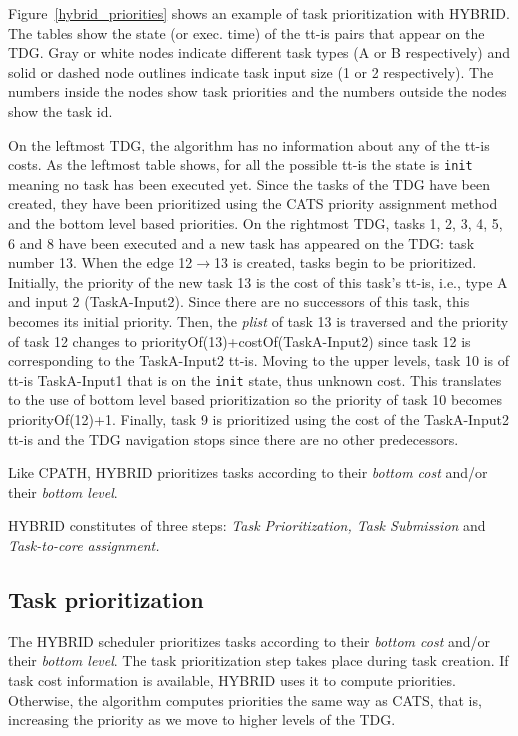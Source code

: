 Figure~\ref{hybrid_priorities} shows an example of task prioritization with HYBRID.
The tables show the state (or exec. time) of the tt-is pairs that appear on the TDG. Gray or white nodes indicate different task types (A or B respectively) and solid or dashed node outlines indicate task input size (1 or 2 respectively). The numbers inside the nodes show task priorities and the numbers outside the nodes show the task id.

On the leftmost TDG, the algorithm has no information about any of the tt-is costs.
As the leftmost table shows, for all the possible tt-is the state is \texttt{init} meaning no task has been executed yet.
Since the tasks of the TDG have been created, they have been prioritized using the CATS priority assignment method and the bottom level based priorities.
On the rightmost TDG, tasks 1, 2, 3, 4, 5, 6 and 8 have been executed and a new task has appeared on the TDG: task number 13.
When the edge 12$\rightarrow$13 is created, tasks begin to be prioritized.
Initially, the priority of the new task 13 is the cost of this task's tt-is, i.e., type A and input 2 (TaskA-Input2). 
Since there are no successors of this task, this becomes its initial priority.
Then, the \textit{plist} of task 13 is traversed and the priority of task 12 changes to priorityOf(13)+costOf(TaskA-Input2) since task 12 is corresponding to the TaskA-Input2 tt-is.
Moving to the upper levels, task 10 is of tt-is TaskA-Input1 that is on the \texttt{init} state, thus unknown cost.
This translates to the use of bottom level based prioritization so the priority of task 10 becomes priorityOf(12)+1.
Finally, task 9 is prioritized using the cost of the TaskA-Input2 tt-is and the TDG navigation stops since there are no other predecessors.



Like CPATH, HYBRID prioritizes tasks according to their \textit{bottom cost} and/or their \textit{bottom level}.

HYBRID constitutes of three steps: \textit{Task Prioritization, Task Submission} and \textit{Task-to-core assignment.}


\subsection{Task prioritization}
The HYBRID scheduler prioritizes tasks according to their \textit{bottom cost} and/or their \textit{bottom level}.
The task prioritization step takes place during task creation.
If task cost information is available, HYBRID uses it to compute priorities.
Otherwise, the algorithm computes priorities the same way as CATS, that is, increasing the priority as we move to higher levels of the TDG.

